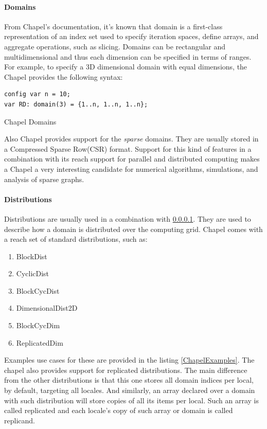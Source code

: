 \documentclass[14pt]{extreport}
\begin{document}
\paragraph{Domains}\label{DomainsSubParagraph}
From Chapel's documentation, it's known that domain is a first-class representation of an index set used to specify iteration spaces, define arrays, and aggregate operations, such as slicing. Domains can be rectangular and multidimensional and thus each dimension can be specified in terms of ranges. For example, to specify a 3D dimensional domain with equal dimensions, the Chapel provides the following syntax:

\begin{listing}[H]
\begin{verbatim}
config var n = 10;
var RD: domain(3) = {1..n, 1..n, 1..n};
\end{verbatim}
\caption{Chapel Domains}
\end{listing}

Also Chapel provides support for the \textit{sparse} domains. They are usually stored in a Compressed Sparse Row(CSR) format. Support for this kind of features in a combination with its reach support for parallel and distributed computing makes a Chapel a very interesting candidate for numerical algorithms, simulations, and analysis of sparse graphs.

\paragraph{Distributions} Distributions are usually used in a combination with \ref{DomainsSubParagraph}. They are used to describe how a domain is distributed over the computing grid.
Chapel comes with a reach set of standard distributions, such as:

\begin{enumerate}
	\item BlockDist
	\item CyclicDist
	\item BlockCycDist
	\item DimensionalDist2D
	\item BlockCycDim
	\item ReplicatedDim
\end{enumerate}

Examples use cases for these are provided in the listing \ref{ChapelExamples}. The chapel also provides support for replicated distributions. The main difference from the other distributions is that this one stores all domain indices per local, by default, targeting all locales. And similarly, an array declared over a domain with such distribution will store copies of all its items per local. Such an array is called replicated and each locale's copy of such array or domain is called replicand.
\end{document}
